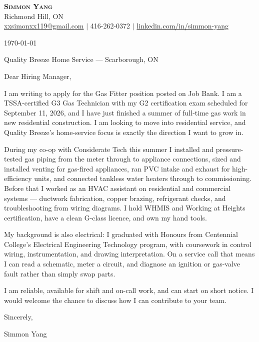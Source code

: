 \documentclass[letterpaper,11pt]{article}
\begin{document}
\begin{center}
    \textbf{\Huge \scshape Simmon Yang} \\ \vspace{1pt}
    Richmond Hill, ON \\
    \href{mailto:xxsimonxx119@gmail.com}{xxsimonxx119@gmail.com} $|$ 416-262-0372 $|$
    \href{https://www.linkedin.com/in/simmon-yang/}{linkedin.com/in/simmon-yang}
\end{center}

\vspace{10pt}

\today

Quality Breeze Home Service --- Scarborough, ON

Dear Hiring Manager,

I am writing to apply for the Gas Fitter position posted on Job Bank. I am a TSSA-certified G3 Gas Technician with my G2 certification exam scheduled for September 11, 2026, and I have just finished a summer of full-time gas work in new residential construction. I am looking to move into residential service, and Quality Breeze's home-service focus is exactly the direction I want to grow in.

During my co-op with Considerate Tech this summer I installed and pressure-tested gas piping from the meter through to appliance connections, sized and installed venting for gas-fired appliances, ran PVC intake and exhaust for high-efficiency units, and connected tankless water heaters through to commissioning. Before that I worked as an HVAC assistant on residential and commercial systems --- ductwork fabrication, copper brazing, refrigerant checks, and troubleshooting from wiring diagrams. I hold WHMIS and Working at Heights certification, have a clean G-class licence, and own my hand tools.

My background is also electrical: I graduated with Honours from Centennial College's Electrical Engineering Technology program, with coursework in control wiring, instrumentation, and drawing interpretation. On a service call that means I can read a schematic, meter a circuit, and diagnose an ignition or gas-valve fault rather than simply swap parts.

I am reliable, available for shift and on-call work, and can start on short notice. I would welcome the chance to discuss how I can contribute to your team.

Sincerely,

Simmon Yang
\end{document}
